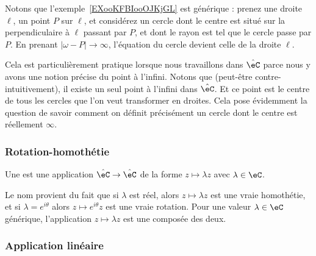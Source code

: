\begin{normaltext}\label{NORMooCXVJooMTMqEU}
	Notons que l'exemple~\ref{EXooKFBIooOJKjGL} est générique : prenez une droite \( \ell\), un point \( P\) sur \( \ell\), et considérez un cercle dont le centre est situé sur la perpendiculaire à \( \ell\) passant par \( P\), et dont le rayon est tel que le cercle passe par \( P\). En prenant \( | \omega-P |\to \infty\), l'équation du cercle devient celle de la droite \( \ell\).

	Cela est particulièrement pratique lorsque nous travaillons dans \( \hat \eC\) parce nous y avons une notion précise du point à l'infini. Notons que (peut-être contre-intuitivement), il existe un seul point à l'infini dans \( \hat \eC\). Et ce point est le centre de tous les cercles que l'on veut transformer en droites. Cela pose évidemment la question de savoir comment on définit précisément un cercle dont le centre est réellement \( \infty\).
\end{normaltext}

\begin{center}
	
\end{center}

\subsubsection{Rotation-homothétie}

\begin{definition}
	Une  est une application \(  \hat \eC \to \hat \eC\) de la forme \( z\mapsto \lambda z\) avec \( \lambda\in \eC\).
\end{definition}
Le nom provient du fait que si \( \lambda\) est réel, alors \( z\mapsto \lambda z\) est une vraie homothétie, et si \( \lambda= e^{i\theta}\) alors \( z\mapsto  e^{i\theta}z\) est une vraie rotation. Pour une valeur \( \lambda\in \eC\) générique, l'application \( z\mapsto \lambda z\) est une composée des deux.

\subsubsection{Application linéaire}
\label{SSUBSooRBCWooSCIQEL}

